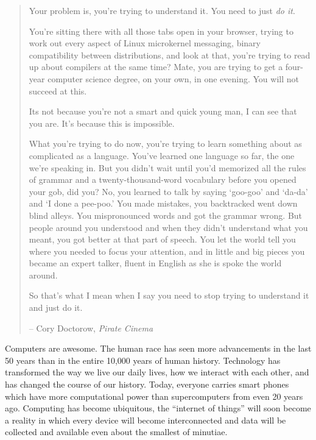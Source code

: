 

\begin{quote}
Your problem is, you're trying to understand it.  You need to 
just \emph{do it}.

You're sitting there with all those tabs open in your browser, 
trying to work out every aspect of Linux microkernel messaging, 
binary compatibility between distributions, and look at that, 
you're trying to read up about compilers at the same time?  Mate, 
you are trying to get a four-year computer science degree, on your 
own, in one evening.  You will not succeed at this.

Its not because you're not a smart and quick young man, I can 
see that you are.  It's because this is impossible.

What you're trying to do now, you're trying to learn something 
about as complicated as a language.  You've learned one language
so far, the one we're speaking in.  But you didn't wait until 
you'd memorized all the rules of grammar and a twenty-thousand-word 
vocabulary before you opened your gob, did you?  No, you learned 
to talk by saying `goo-goo' and `da-da' and `I done a pee-poo.'  
You made mistakes, you backtracked went down blind alleys.  You 
mispronounced words and got the grammar wrong.  But people around 
you understood and when they didn't understand what you meant, 
you got better at that part of speech.  You let the world tell 
you where you needed to focus your attention, and in little and 
big pieces you became an expert talker, fluent in English as 
she is spoke the world around.

So that's what I mean when I say you need to stop trying to 
understand it and just do it.

-- Cory Doctorow, \emph{Pirate Cinema} \cite{doctorow2012pirate}

\end{quote}

Computers are awesome.  The human race has seen more advancements in the 
last 50 years than in the entire 10,000 years of human history.  Technology has
transformed the way we live our daily lives, how we interact with each other, and
has changed the course of our history.  Today, everyone carries smart phones
which have more computational power than supercomputers from even 20 years ago.
Computing has become ubiquitous, the ``internet of things'' will soon become
a reality in which every device will become interconnected and data will be collected
and available even about the smallest of minutiae.

